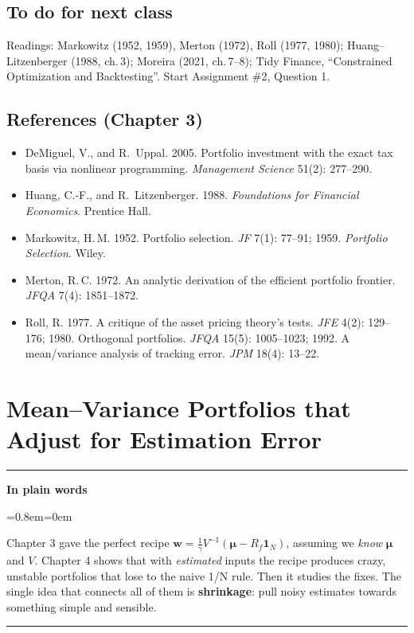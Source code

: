 \documentclass[11pt,a4paper]{report}
\newenvironment{notebox}[1]
  {\par\medskip\Needspace{6\baselineskip}\noindent\rule{\linewidth}{0.4pt}\par\nopagebreak
   \noindent\textbf{#1}\par\nopagebreak
   \begin{list}{}{\leftmargin=0.8em\rightmargin=0em\topsep=2pt}\item[]}
  {\end{list}\nopagebreak\noindent\rule{\linewidth}{0.4pt}\par\medskip}
\newenvironment{plainbox}{\begin{notebox}{In plain words}}{\end{notebox}}
\newcommand{\one}{\mathbf{1}_N}
\newcommand{\w}{\bm{w}}
\newcommand{\mub}{\bm{\mu}}
\begin{document}
\section{To do for next class}
Readings: Markowitz (1952, 1959), Merton (1972), Roll (1977, 1980);
Huang--Litzenberger (1988, ch.\,3); Moreira (2021, ch.\,7--8); Tidy Finance,
``Constrained Optimization and Backtesting''. Start Assignment \#2, Question 1.

\section*{References (Chapter 3)}
\begin{itemize}[leftmargin=*]\small
\item DeMiguel, V., and R.~Uppal. 2005. Portfolio investment with the exact tax basis via nonlinear programming. \emph{Management Science} 51(2): 277--290.
\item Huang, C.-F., and R.~Litzenberger. 1988. \emph{Foundations for Financial Economics}. Prentice Hall.
\item Markowitz, H.\,M. 1952. Portfolio selection. \emph{JF} 7(1): 77--91; 1959. \emph{Portfolio Selection}. Wiley.
\item Merton, R.\,C. 1972. An analytic derivation of the efficient portfolio frontier. \emph{JFQA} 7(4): 1851--1872.
\item Roll, R. 1977. A critique of the asset pricing theory's tests. \emph{JFE} 4(2): 129--176; 1980. Orthogonal portfolios. \emph{JFQA} 15(5): 1005--1023; 1992. A mean/variance analysis of tracking error. \emph{JPM} 18(4): 13--22.
\end{itemize}



\chapter{Mean--Variance Portfolios that Adjust for Estimation Error}
\label{ch:4}

\begin{plainbox}
Chapter 3 gave the perfect recipe $\w=\frac1\gamma V^{-1}(\mub-R_f\one)$, assuming
we \emph{know} $\mub$ and $V$. Chapter 4 shows that with \emph{estimated} inputs
the recipe produces crazy, unstable portfolios that lose to the naive 1/N rule.
Then it studies the fixes. The single idea that connects all of them is
\textbf{shrinkage}: pull noisy estimates towards something simple and sensible.
\end{plainbox}
\end{document}
